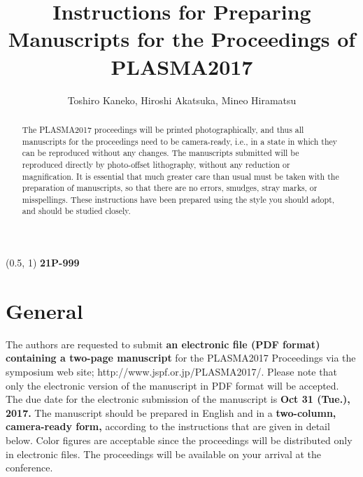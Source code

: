 \documentclass[a4paper,twocolumn,fleqn]{article}
\begin{document}
\title{Instructions for Preparing Manuscripts for the Proceedings of PLASMA2017}


\author{Toshiro Kaneko, Hiroshi Akatsuka, Mineo Hiramatsu}



\begin{abstract}
  The PLASMA2017 proceedings will be printed photographically,
  and thus all manuscripts for the proceedings need to be camera-ready,
  i.e., in a state in which they can be reproduced without any changes.
  The manuscripts submitted will be reproduced directly by photo-offset
  lithography, without any reduction or magnification.
  It is essential that much greater care than usual must be
  taken with the preparation of manuscripts, so that there are no errors,
  smudges, stray marks, or misspellings.
  These instructions have been prepared using the style you should adopt,
  and should be studied closely.
\end{abstract}

\maketitle  %

\begin{textblock}{99}(0.5, 1)
  \textbf{\LARGE{21P-999}}
\end{textblock}


\section{General}

The authors are requested to submit
\textbf{an electronic file (PDF format) containing a two-page manuscript}
for the PLASMA2017 Proceedings via the symposium web site;
http://www.jspf.or.jp/PLASMA2017/.
%
Please note that only the electronic version of the manuscript
in PDF format will be accepted.
%
The due date for the electronic submission of the manuscript is
\textbf{Oct 31 (Tue.), 2017. }
%
The manuscript should be prepared in English and in a
\textbf{two-column, camera-ready form,}
according to the instructions that are given in detail below.
%
Color figures are acceptable since the proceedings will be distributed
only in electronic files.
The proceedings will be available on your arrival at the conference.
\end{document}
